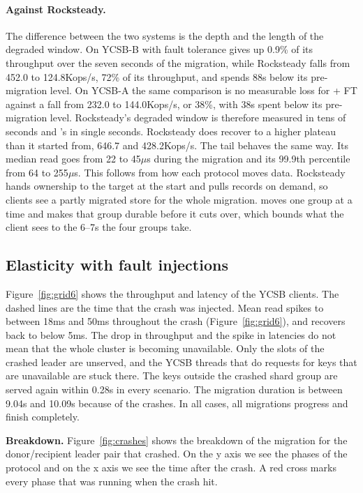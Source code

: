 \paragraph{Against Rocksteady.}
The difference between the two systems is the depth and the length of the degraded
window.
On YCSB-B \OurImplementation{} with fault tolerance gives up 0.9\% of its throughput over
the seven seconds of the migration, while Rocksteady falls from 452.0 to 124.8Kops/s, 72\%
of its throughput, and spends 88s below its pre-migration level.
On YCSB-A the same comparison is no measurable loss for \OurImplementation{} + FT against
a fall from 232.0 to 144.0Kops/s, or 38\%, with 38s spent below its pre-migration level.
Rocksteady's degraded window is therefore measured in tens of seconds and
\OurImplementation{}'s in single seconds.
Rocksteady does recover to a higher plateau than it started from, 646.7 and 428.2Kops/s.
The tail behaves the same way.
Its median read goes from 22 to 45$\mu$s during the migration and its 99.9th percentile
from 64 to 255$\mu$s.
This follows from how each protocol moves data.
Rocksteady hands ownership to the target at the start and pulls records on demand, so
clients see a partly migrated store for the whole migration.
\OurImplementation{} moves one group at a time and makes that group durable before it
cuts over, which bounds what the client sees to the 6--7s the four groups take.

\subsection{Elasticity with fault injections}
\label{sec:eval-scaleout}


Figure~\ref{fig:grid6} shows the throughput and latency of the YCSB clients.
The dashed lines are the time that the crash was injected.
Mean read spikes to between 18ms and 50ms throughout the crash (Figure~\ref{fig:grid6}), and recovers back to below 5ms.
The drop in throughput and the spike in latencies do not mean that the whole cluster is becoming unavailable.
Only the slots of the crashed leader are unserved, and the YCSB threads that do requests for keys that are unavailable are stuck there.
The keys outside the crashed shard group are served again within 0.28s in every scenario.
The migration duration is between 9.04s and 10.09s because of the crashes.
In all cases, all migrations progress and finish completely.

\noindent\textbf{Breakdown.}
\label{sec:eval-phases}
Figure~\ref{fig:crashes} shows the breakdown of the migration for the donor/recipient leader pair that crashed.
On the y axis we see the phases of the protocol and on the x axis we see the time after the crash.
A red cross marks every phase that was running when the crash hit.

